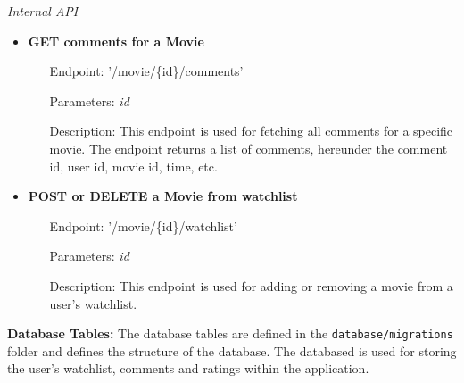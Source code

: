 \textit{Internal API}
\begin{itemize}
    \item \textbf{GET comments for a Movie}
    \begin{itemize}
        \item [Endpoint:] '/movie/\{id\}/comments'
        \item [Parameters:] \textit{id}
        \item [Description:] This endpoint is used for fetching all comments for a specific movie. The endpoint returns a list of comments, hereunder the comment id, user id, movie id, time, etc.
    \end{itemize}
    \item \textbf{POST or DELETE a Movie from watchlist}
    \begin{itemize}
        \item [Endpoint:] '/movie/\{id\}/watchlist'
        \item [Parameters:] \textit{id}
        \item [Description:] This endpoint is used for adding or removing a movie from a user's watchlist.
    \end{itemize}
\end{itemize}

\textbf{Database Tables:}
The database tables are defined in the \texttt{database/migrations} folder and defines the structure of the database. The databased is used for storing the user's watchlist, comments and ratings within the application.

